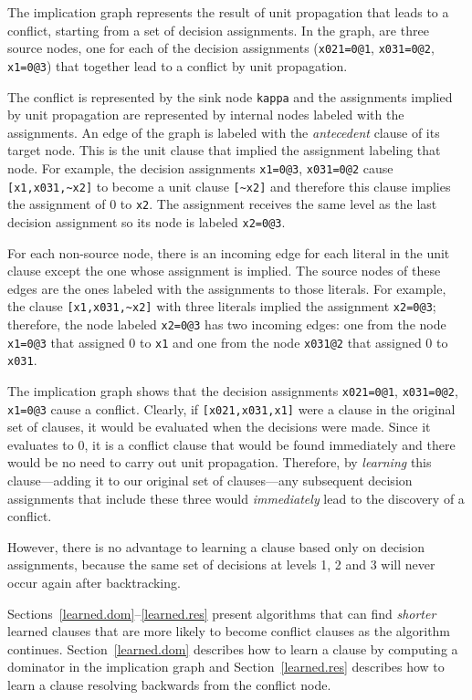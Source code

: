 \documentclass[11pt]{report}
\newcommand*{\p}[1]{\textup{\texttt{#1}}}
\begin{document}
The implication graph represents the result of unit propagation that
leads to a conflict, starting from a set of decision assignments. In the
graph, are three source nodes, one for each of the decision assignments
(\p{x021=0@1}, \p{x031=0@2}, \p{x1=0@3}) that together lead to a
conflict by unit propagation.

The conflict is represented by the sink node \p{kappa} and the
assignments implied by unit propagation are represented by internal nodes labeled with the assignments. An edge of the graph is labeled with the
\emph{antecedent} clause of its target node. This is the unit clause
that implied the assignment labeling that node. For example, the
decision assignments \p{x1=0@3}, \p{x031=0@2} cause \verb+[x1,x031,~x2]+
to become a unit clause \verb+[~x2]+ and therefore this clause implies
the assignment of 0 to \p{x2}. The assignment receives the same level as
the last decision assignment so its node is labeled \p{x2=0@3}.

For each non-source node, there is an incoming edge for each literal in
the unit clause except the one whose assignment is implied. The
source nodes of these edges are the ones labeled with the assignments to
those literals. For example, the clause \verb+[x1,x031,~x2]+ with three
literals implied the assignment \p{x2=0@3}; therefore, the node labeled \p{x2=0@3} has two incoming edges: one from the node \p{x1=0@3} that assigned 0 to \p{x1} and one from the node \p{x031@2} that assigned 0 to \p{x031}.

The implication graph shows that the decision assignments \p{x021=0@1},
\p{x031=0@2}, \p{x1=0@3} cause a conflict. Clearly, if
\verb+[x021,x031,x1]+ were a clause in the original set of clauses, it
would be evaluated when the decisions were made. Since it evaluates to
0, it is a conflict clause that would be found immediately and there
would be no need to carry out unit propagation. Therefore, by
\emph{learning} this clause---adding it to our original set of
clauses---any subsequent decision assignments that include these three
would \emph{immediately} lead to the discovery of a conflict.

However, there is no advantage to learning a clause based only on decision assignments, because the same set of decisions at levels 1, 2 and 3 will never occur again after backtracking.

Sections~\ref{learned.dom}--\ref{learned.res} present algorithms that
can find \emph{shorter} learned clauses that are more likely to become
conflict clauses as the algorithm continues. Section~\ref{learned.dom}
describes how to learn a clause by computing a dominator in the
implication graph and Section~\ref{learned.res} describes how to learn a
clause resolving backwards from the conflict node.
\end{document}
